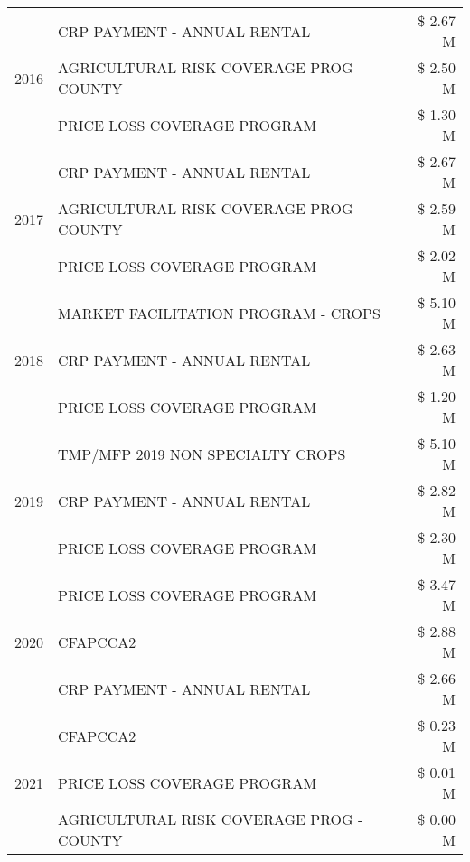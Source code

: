 \begin{tabular}{llr}
\cline{1-3}
\multirow[t]{3}{*}{2016} & CRP PAYMENT - ANNUAL RENTAL & \$ 2.67 M \\
 & AGRICULTURAL RISK COVERAGE PROG - COUNTY & \$ 2.50 M \\
 & PRICE LOSS COVERAGE PROGRAM & \$ 1.30 M \\
\cline{1-3}
\multirow[t]{3}{*}{2017} & CRP PAYMENT - ANNUAL RENTAL & \$ 2.67 M \\
 & AGRICULTURAL RISK COVERAGE PROG - COUNTY & \$ 2.59 M \\
 & PRICE LOSS COVERAGE PROGRAM & \$ 2.02 M \\
\cline{1-3}
\multirow[t]{3}{*}{2018} & MARKET FACILITATION PROGRAM - CROPS & \$ 5.10 M \\
 & CRP PAYMENT - ANNUAL RENTAL & \$ 2.63 M \\
 & PRICE LOSS COVERAGE PROGRAM & \$ 1.20 M \\
\cline{1-3}
\multirow[t]{3}{*}{2019} & TMP/MFP 2019 NON SPECIALTY CROPS & \$ 5.10 M \\
 & CRP PAYMENT - ANNUAL RENTAL & \$ 2.82 M \\
 & PRICE LOSS COVERAGE PROGRAM & \$ 2.30 M \\
\cline{1-3}
\multirow[t]{3}{*}{2020} & PRICE LOSS COVERAGE PROGRAM & \$ 3.47 M \\
 & CFAPCCA2 & \$ 2.88 M \\
 & CRP PAYMENT - ANNUAL RENTAL & \$ 2.66 M \\
\cline{1-3}
\multirow[t]{3}{*}{2021} & CFAPCCA2 & \$ 0.23 M \\
 & PRICE LOSS COVERAGE PROGRAM & \$ 0.01 M \\
 & AGRICULTURAL RISK COVERAGE PROG - COUNTY & \$ 0.00 M \\
\cline{1-3}
\bottomrule
\end{tabular}
